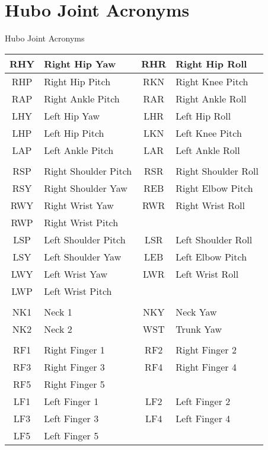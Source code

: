 \chapter{Hubo Joint Acronyms}
\Large
\centering
Hubo Joint Acronyms\\
\normalsize
\begin{longtable}{c | l || c | l}
\hline
		RHY				&	Right Hip Yaw     & RHR				&	Right Hip Roll \\
		\hline
		RHP				&	Right Hip Pitch   & RKN				&	Right Knee Pitch\\
		\hline
		RAP				&	Right Ankle Pitch & RAR				&	Right Ankle Roll\\
\hline

\hline
		LHY				&	Left Hip Yaw      & LHR				&	Left Hip Roll\\
		\hline
		LHP				&	Left Hip Pitch    & LKN				&	Left Knee Pitch\\
		\hline
		LAP				&	Left Ankle Pitch  & LAR				&	Left Ankle Roll\\
\hline
& & & \\
\hline
		RSP				&	Right Shoulder Pitch & RSR			&	Right Shoulder Roll\\
		\hline
		RSY				&	Right Shoulder Yaw   & REB			&	Right Elbow Pitch\\
		\hline
		RWY				&   Right Wrist Yaw      & RWR			&   Right Wrist Roll\\
		\hline
		RWP				&   Right Wrist Pitch    & & \\
\hline

\hline
		LSP				&	Left Shoulder Pitch  & LSR		    &	Left Shoulder Roll\\
		\hline
		LSY				&	Left Shoulder Yaw    & LEB			&	Left Elbow Pitch\\
		\hline
		LWY				&   Left Wrist Yaw       & LWR			&   Left Wrist Roll\\
		\hline
		LWP				&   Left Wrist Pitch	 & & \\
\hline
& & & \\
\hline
		NK1				& Neck 1    & NKY				& Neck Yaw\\
		\hline
	    NK2				& Neck 2    & WST				& Trunk Yaw \\
\hline

		  & & \\
\hline
		RF1				&	Right Finger 1 & RF2				&	Right Finger 2\\
		\hline
		RF3				&	Right Finger 3 & RF4				&	Right Finger 4\\
		\hline
		RF5				&	Right Finger 5 & & \\
\hline

\hline
		LF1				&	Left Finger 1 & LF2				&	Left Finger 2\\
		\hline
		LF3				&	Left Finger 3 & LF4				&	Left Finger 4\\
		\hline
		LF5				&	Left Finger 5 & & \\
		
\end{longtable}
